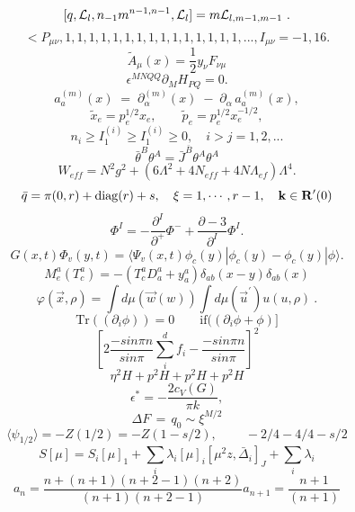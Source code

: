\documentclass{article}
\begin{document}
$$[ q , { \cal L } _ { l } , n _ { - 1 } m ^ { n - 1 , n - 1 } , { \cal L } _ { l } ] = m { \cal L } _ { l , m - 1 , m - 1 } \ .$$
$$< P _ { \mu \nu } , 1 , 1 , 1 , 1 , 1 , 1 , 1 , 1 , 1 , 1 , 1 , 1 , 1 , 1 , 1 , . . . , I _ { \mu \nu } = - 1 , 1 6 .$$
$$\tilde { A } _ { \mu } ( x ) = \frac { 1 } { 2 } y _ { \nu } F _ { \nu \mu }$$
$$\epsilon ^ { M N Q Q } \partial _ { M } H _ { P Q } = 0 .$$
$$a _ { a } ^ { ( m ) } ( x ) \; = \; \partial _ { \alpha } ^ { ( m ) } ( x ) \; - \; \partial _ { \alpha } \, a _ { a } ^ { ( m ) } ( x ) ,$$
$$\tilde { x } _ { e } = p _ { e } ^ { 1 / 2 } x _ { e } , \qquad \tilde { p } _ { e } = p _ { e } ^ { 1 / 2 } x _ { e } ^ { - 1 / 2 } ,$$
$$n _ { i } \geq I _ { 1 } ^ { ( i ) } \geq I _ { 1 } ^ { ( i ) } \geq 0 , \quad i > j = 1 , 2 , . . .$$
$$\bar { \theta } ^ { B } \theta ^ { A } = \bar { J } ^ { \bar { B } } \theta ^ { A } \theta ^ { A }$$
$$W _ { e f f } = N ^ { 2 } g ^ { 2 } + ( 6 \Lambda ^ { 2 } + 4 N _ { e f f } + 4 N \Lambda _ { e f } ) \Lambda ^ { 4 } .$$
$$\bar { q } = \pi ( 0 , r ) + \mathrm { d i a g } ( r ) + s , \quad \xi = 1 , \cdots , r - 1 , \quad { \bf k } \in { \bf R } ^ { \prime } ( 0 )$$
$$\Phi ^ { I } = - \frac { \partial ^ { I } } { \partial ^ { + } } \Phi ^ { - } + \frac { \partial - 3 } { \partial ^ { I } } \Phi ^ { I } .$$
$$G ( x , t ) \Phi _ { v } ( y , t ) = \langle \Psi _ { v } ( x , t ) \phi _ { c } ( y ) | \phi _ { c } ( y ) - \phi _ { c } ( y ) | \phi \rangle .$$
$$M _ { e } ^ { a } ( T _ { c } ^ { a } ) = - ( T _ { c } ^ { a } D _ { a } ^ { a } + y _ { a } ^ { a } ) \delta _ { a b } ( x - y ) \delta _ { a b } ( x )$$
$$\varphi ( { \vec { x } } , \rho ) = \int d \mu ( \vec { w } ( w ) ) \int d \mu ( \vec { u } ^ { \prime } ) u ( u , \rho ) \ .$$
$$\mathrm { T r } ( ( \partial _ { i } \phi ) ) = 0 \qquad \mathrm { i f } ( ( \partial _ { i } \phi + \phi ) ]$$
$$\left [ 2 \frac { - s i n \pi n } { s i n \pi } \sum _ { i } ^ { d } f _ { i } - \frac { - s i n \pi n } { s i n \pi } \right ] ^ { 2 }$$
$$\eta ^ { 2 } H + p ^ { 2 } H + p ^ { 2 } H + p ^ { 2 } H$$
$$\epsilon ^ { * } = - \frac { 2 c _ { V } ( G ) } { \pi k } ,$$
$$\Delta F \, = \, q _ { 0 } \sim \xi ^ { M / 2 }$$
$$\langle \psi _ { 1 / 2 } \rangle = - Z ( 1 / 2 ) = - Z ( 1 - s / 2 ) , \; \; \; \; \; \; \; \; - 2 / 4 - 4 / 4 - s / 2$$
$$S [ \mu ] = S _ { i } [ \mu ] _ { 1 } + \sum _ { i } \lambda _ { i } [ \mu ] _ { i } [ \mu ^ { 2 } z , \bar { \Delta } _ { i } ] _ { J } + \sum _ { i } \lambda _ { i }$$
$$a _ { n } = \frac { n + ( n + 1 ) ( n + 2 - 1 ) ( n + 2 ) } { ( n + 1 ) ( n + 2 - 1 ) } a _ { n + 1 } = \frac { n + 1 } { ( n + 1 ) }$$
\end{document}
